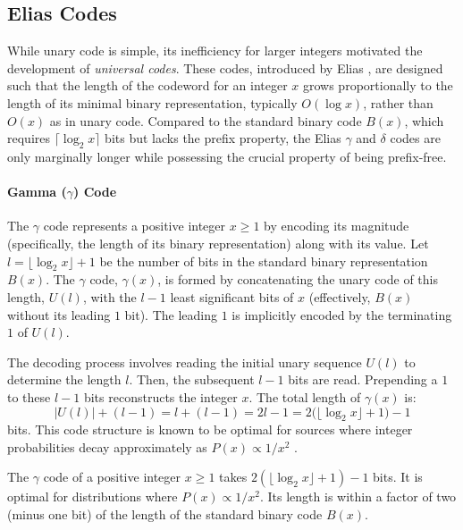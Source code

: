 \subsection{Elias Codes}
While unary code is simple, its inefficiency for larger integers motivated the development of \emph{universal codes}. These codes, introduced by Elias \cite{Elias1975}, are designed such that the length of the codeword for an integer $x$ grows proportionally to the length of its minimal binary representation, typically $O(\log x)$, rather than $O(x)$ as in unary code. Compared to the standard binary code $B(x)$, which requires $\lceil\log_2 x \rceil$ bits but lacks the prefix property, the Elias $\gamma$ and $\delta$ codes are only marginally longer while possessing the crucial property of being prefix-free.

\paragraph{Gamma ($\gamma$) Code} The $\gamma$ code represents a positive integer $x \ge 1$ by encoding its magnitude (specifically, the length of its binary representation) along with its value. Let $l = \lfloor \log_2 x \rfloor + 1$ be the number of bits in the standard binary representation $B(x)$. The $\gamma$ code, $\gamma(x)$, is formed by concatenating the unary code of this length, $U(l)$, with the $l-1$ least significant bits of $x$ (effectively, $B(x)$ without its leading $1$ bit). The leading $1$ is implicitly encoded by the terminating $1$ of $U(l)$.

The decoding process involves reading the initial unary sequence $U(l)$ to determine the length $l$. Then, the subsequent $l-1$ bits are read. Prepending a $1$ to these $l-1$ bits reconstructs the integer $x$. The total length of $\gamma(x)$ is:
\begin{equation*}
    |U(l)| + (l-1) = l + (l-1) = 2l - 1 = 2\bigl(\lfloor \log_2 x \rfloor + 1\bigr) - 1
\end{equation*}
bits. This code structure is known to be optimal for sources where integer probabilities decay approximately as $P(x) \propto 1/x^2$ \cite{witten1999managing}.

\begin{theorem}
    The $\gamma$ code of a positive integer $x \ge 1$ takes $2(\lfloor \log_2 x \rfloor + 1) - 1$ bits. It is optimal for distributions where $P(x) \propto 1/x^2$. Its length is within a factor of two (minus one bit) of the length of the standard binary code $B(x)$.
\end{theorem}

